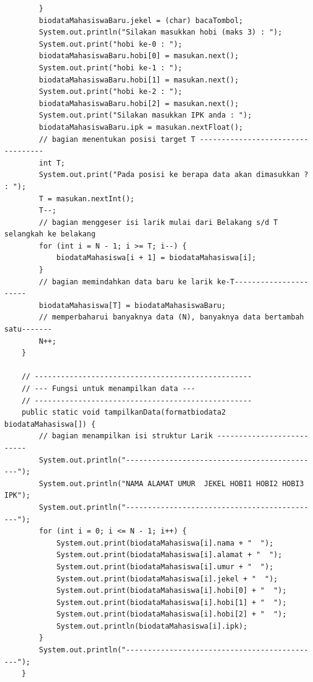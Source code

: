 \documentclass[a4paper,12pt]{article}
\begin{document}
\begin{lstlisting}
        }
        biodataMahasiswaBaru.jekel = (char) bacaTombol;
        System.out.println("Silakan masukkan hobi (maks 3) : ");
        System.out.print("hobi ke-0 : ");
        biodataMahasiswaBaru.hobi[0] = masukan.next();
        System.out.print("hobi ke-1 : ");
        biodataMahasiswaBaru.hobi[1] = masukan.next();
        System.out.print("hobi ke-2 : ");
        biodataMahasiswaBaru.hobi[2] = masukan.next();
        System.out.print("Silakan masukkan IPK anda : ");
        biodataMahasiswaBaru.ipk = masukan.nextFloat();
        // bagian menentukan posisi target T ----------------------------------
        int T;
        System.out.print("Pada posisi ke berapa data akan dimasukkan ? : ");
        T = masukan.nextInt();
        T--;
        // bagian menggeser isi larik mulai dari Belakang s/d T selangkah ke belakang
        for (int i = N - 1; i >= T; i--) {
            biodataMahasiswa[i + 1] = biodataMahasiswa[i];
        }
        // bagian memindahkan data baru ke larik ke-T----------------------
        biodataMahasiswa[T] = biodataMahasiswaBaru;
        // memperbaharui banyaknya data (N), banyaknya data bertambah satu-------
        N++;
    }

    // --------------------------------------------------
    // --- Fungsi untuk menampilkan data ---
    // --------------------------------------------------
    public static void tampilkanData(formatbiodata2 biodataMahasiswa[]) {
        // bagian menampilkan isi struktur Larik --------------------------
        System.out.println("---------------------------------------------");
        System.out.println("NAMA ALAMAT UMUR  JEKEL HOBI1 HOBI2 HOBI3 IPK");
        System.out.println("---------------------------------------------");
        for (int i = 0; i <= N - 1; i++) {
            System.out.print(biodataMahasiswa[i].nama + "  ");
            System.out.print(biodataMahasiswa[i].alamat + "  ");
            System.out.print(biodataMahasiswa[i].umur + "  ");
            System.out.print(biodataMahasiswa[i].jekel + "  ");
            System.out.print(biodataMahasiswa[i].hobi[0] + "  ");
            System.out.print(biodataMahasiswa[i].hobi[1] + "  ");
            System.out.print(biodataMahasiswa[i].hobi[2] + "  ");
            System.out.println(biodataMahasiswa[i].ipk);
        }
        System.out.println("---------------------------------------------");
    }


\end{lstlisting}
\end{document}
